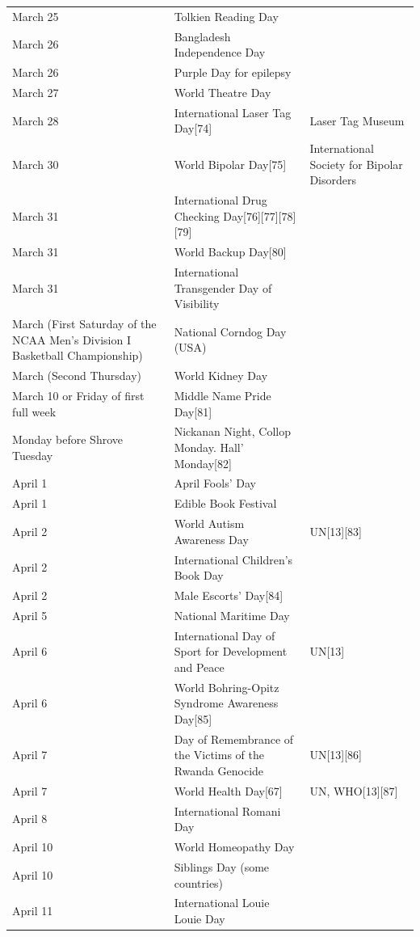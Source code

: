 \documentclass[
  openany]{book}
\begin{document}
\begin{longtable}[t]{>{\raggedright\arraybackslash}p{8em}>{\raggedright\arraybackslash}p{20em}>{\raggedright\arraybackslash}p{12em}}
March 25 & Tolkien Reading Day & \\
March 26 & Bangladesh Independence Day & \\
March 26 & Purple Day for epilepsy & \\
March 27 & World Theatre Day & \\
\addlinespace
March 28 & International Laser Tag Day[74] & Laser Tag Museum\\
March 30 & World Bipolar Day[75] & International Society for Bipolar Disorders\\
March 31 & International Drug Checking Day[76][77][78][79] & \\
March 31 & World Backup Day[80] & \\
March 31 & International Transgender Day of Visibility & \\
\addlinespace
March (First Saturday of the NCAA Men's Division I Basketball Championship) & National Corndog Day (USA) & \\
March (Second Thursday) & World Kidney Day & \\
March 10 or Friday of first full week & Middle Name Pride Day[81] & \\
Monday before Shrove Tuesday & Nickanan Night, Collop Monday. Hall' Monday[82] & \\
April 1 & April Fools' Day & \\
\addlinespace
April 1 & Edible Book Festival & \\
April 2 & World Autism Awareness Day & UN[13][83]\\
April 2 & International Children's Book Day & \\
April 2 & Male Escorts' Day[84] & \\
April 5 & National Maritime Day & \\
\addlinespace
April 6 & International Day of Sport for Development and Peace & UN[13]\\
April 6 & World Bohring-Opitz Syndrome Awareness Day[85] & \\
April 7 & Day of Remembrance of the Victims of the Rwanda Genocide & UN[13][86]\\
April 7 & World Health Day[67] & UN, WHO[13][87]\\
April 8 & International Romani Day & \\
\addlinespace
April 10 & World Homeopathy Day & \\
April 10 & Siblings Day (some countries) & \\
April 11 & International Louie Louie Day & \\

\end{longtable}
\end{document}
